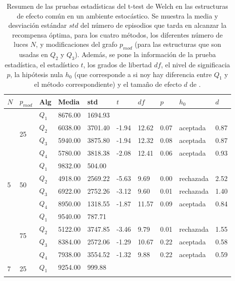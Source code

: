 \begin{table}[]
\centering
\caption{Resumen de las pruebas estadísticas del t-test de Welch en las
estructuras de efecto común en un ambiente estocástico. Se muestra la media y desviación estándar $std$ del número 
de episodios que tarda en alcanzar la recompensa óptima, para los cuatro métodos, los diferentes número de luces $N$, y modificaciones del grafo $p_{mod}$ (para las estructuras que son usadas en $Q_2$ y $Q_3$). Además, se pone la información
de la prueba estadística, el estadístico $t$, los grados de libertad $df$, el nivel
de significacia $p$, la hipótesis nula $h_0$ (que corresponde a si noy hay diferencia entre $Q_1$ y el método correspondiente) y el tamaño de efecto $d$ de \citet{cohen2013statistical}.}
\label{tab:common-effect-pmod-sto}
\begin{tabular}{|l|l|l|l|l|l|l|l|l|l|}
\hline
$N$ & $p_{mod}$ & Alg & Media & std & $t$ & $df$ & $p$ & $h_0$ & $d$ \\ \hline
\multirow{12}{*}{5} & \multirow{4}{*}{25} & $Q_1$ & 8676.00 & 1694.93 & \multicolumn{5}{l|}{} \\ \cline{3-10} 
 &  & $Q_2$ & 6038.00 & 3701.40 & -1.94 & 12.62 & 0.07 & aceptada & 0.87 \\ \cline{3-10} 
 &  & $Q_3$ & 5940.00 & 3875.80 & -1.94 & 12.32 & 0.08 & aceptada & 0.87 \\ \cline{3-10} 
 &  & $Q_4$ & 5780.00 & 3818.38 & -2.08 & 12.41 & 0.06 & aceptada & 0.93 \\ \cline{2-10} 
 & \multirow{4}{*}{50} & $Q_1$ & 9832.00 & 504.00 & \multicolumn{5}{l|}{} \\ \cline{3-10} 
 &  & $Q_2$ & 4918.00 & 2569.22 & -5.63 & 9.69 & 0.00 & rechazada & 2.52 \\ \cline{3-10} 
 &  & $Q_3$ & 6922.00 & 2752.26 & -3.12 & 9.60 & 0.01 & rechazada & 1.40 \\ \cline{3-10} 
 &  & $Q_4$ & 8950.00 & 1318.55 & -1.87 & 11.57 & 0.09 & aceptada & 0.84 \\ \cline{2-10} 
 & \multirow{4}{*}{75} & $Q_1$ & 9540.00 & 787.71 & \multicolumn{5}{l|}{} \\ \cline{3-10} 
 &  & $Q_2$ & 5122.00 & 3747.85 & -3.46 & 9.79 & 0.01 & rechazada & 1.55 \\ \cline{3-10} 
 &  & $Q_3$ & 8384.00 & 2572.06 & -1.29 & 10.67 & 0.22 & aceptada & 0.58 \\ \cline{3-10} 
 &  & $Q_4$ & 7938.00 & 3554.52 & -1.32 & 9.88 & 0.22 & aceptada & 0.59 \\ \hline
\multirow{12}{*}{7} & \multirow{4}{*}{25} & $Q_1$ & 9254.00 & 999.88 & \multicolumn{5}{l|}{} \\ \cline{3-10} 

\end{tabular}
\end{table}
